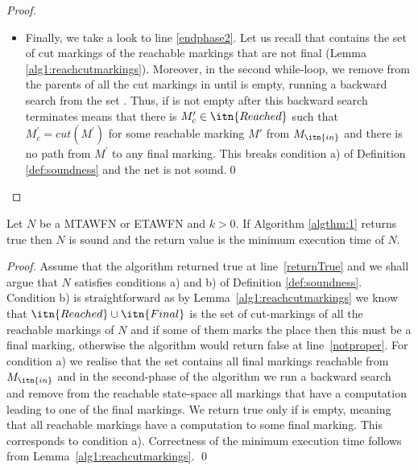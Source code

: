 \begin{proof}
\begin{itemize}
	\item Finally, we take a look to line \ref{endphase2}. Let us recall that  contains the set of cut markings of the reachable markings 
	that are not final (Lemma \ref{alg1:reachcutmarkings}). Moreover, in the second while-loop, we 
	remove from  the parents of all the cut markings in  until  is empty, running a backward search from the set
. Thus, if  is not empty after this backward search 
terminates means that there is $M^\prime_c \in \itn{Reached}$ 
such that $M^\prime_c=cut(M^\prime)$ for some reachable marking
$M'$ from $M_\itn{in}$ and there is no path from $M^\prime$ to any
final marking. This breaks condition a) of Definition \ref{def:soundness} and
the net is not sound.\qed
	\end{itemize}	
\end{proof}

\begin{lemma}\label{algthm:1:true}
	Let $N$ be a MTAWFN or ETAWFN and $k > 0$. If Algorithm \ref{algthm:1} returns true then $N$ is sound and the return value is the minimum execution
time of $N$.
\end{lemma}
\begin{proof}
Assume that the algorithm returned true at line~\ref{returnTrue} 
and we shall argue
that $N$ satisfies conditions a) and b) of Definition \ref{def:soundness}.
Condition b) is straightforward as by Lemma~\ref{alg1:reachcutmarkings}
we know that $\itn{Reached} \cup \itn{Final}$ is the set of cut-markings 
of all the reachable markings of $N$ and if some of them
marks the place  then this must be a final marking, otherwise
the algorithm would return false at line~\ref{notproper}.
For condition a) we realise that the set  contains
all final markings reachable from $M_\itn{in}$ and 
in the second-phase of the algorithm we run a backward search
and remove from the reachable state-space all markings that have
a computation leading to one of the final markings. We
return true only if  is empty, meaning that all reachable markings
have a computation to some final marking. This corresponds to
condition a).
Correctness of the minimum execution time follows from Lemma~\ref{alg1:reachcutmarkings}.
\qed
\end{proof}
